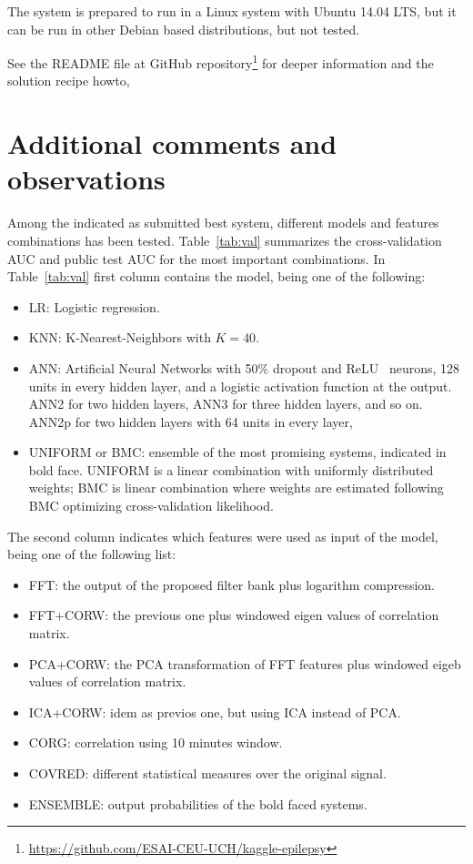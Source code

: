 \documentclass[a4paper,english,twoside]{article}
\begin{document}
The system is prepared to run in a Linux system with Ubuntu 14.04 LTS, but it
can be run in other Debian based distributions, but not tested.

See the README file at GitHub
repository\footnote{\url{https://github.com/ESAI-CEU-UCH/kaggle-epilepsy}} for
deeper information and the solution recipe howto,

\section{Additional comments and
  observations}\label{additional-comments-and-observations}

Among the indicated as submitted best system, different models and
features combinations has been tested. Table~\ref{tab:val} summarizes
the cross-validation AUC and public test AUC for the most important
combinations. In Table~\ref{tab:val} first column contains the model, being one
of the following:

\begin{itemize}
\item
  LR: Logistic regression.
\item
  KNN: K-Nearest-Neighbors with $K=40$.
\item ANN: Artificial Neural Networks with 50\% dropout and
  ReLU~\cite{2011:glorot:aistats} neurons, 128 units in every hidden layer, and
  a logistic activation function at the output.  ANN2 for two hidden layers,
  ANN3 for three hidden layers, and so on. ANN2p for two hidden layers with 64
  units in every layer,
\item
  UNIFORM or BMC: ensemble of the most promising systems, indicated in
  bold face. UNIFORM is a linear combination with uniformly distributed
  weights; BMC is linear combination where weights are estimated
  following BMC optimizing cross-validation likelihood.
\end{itemize}

The second column indicates which features were used as input of the
model, being one of the following list:

\begin{itemize}
\item
  FFT: the output of the proposed filter bank plus logarithm
  compression.
\item
  FFT+CORW: the previous one plus windowed eigen values of correlation
  matrix.
\item
  PCA+CORW: the PCA transformation of FFT features plus windowed eigeb
  values of correlation matrix.
\item
  ICA+CORW: idem as previos one, but using ICA instead of PCA.
\item
  CORG: correlation using 10 minutes window.
\item
  COVRED: different statistical measures over the original signal.
\item
  ENSEMBLE: output probabilities of the bold faced systems.
\end{itemize}
\end{document}
